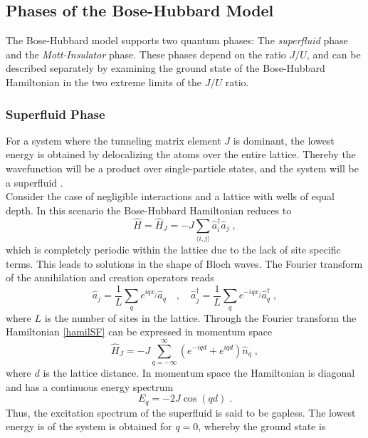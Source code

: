 \subsection{Phases of the Bose-Hubbard Model}

The Bose-Hubbard model supports two quantum phases: The \textit{superfluid} phase and the \textit{Mott-Insulator} phase. These phases depend on the ratio $J/U$, and can be described separately by examining the ground state of the Bose-Hubbard Hamiltonian in the two extreme limits of the $J/U$ ratio.

\subsubsection{Superfluid Phase}
For a system where the tunneling matrix element $J$ is dominant, the lowest energy is obtained by delocalizing the atoms over the entire lattice. Thereby the wavefunction will be a product over single-particle states, and the system will be a superfluid \cite{greiner}.\\
Consider the case of negligible interactions and a lattice with wells of equal depth. In this scenario the Bose-Hubbard Hamiltonian reduces to
\begin{equation}
	\hat{H} = \hat{H}_J = - J \sum_{\langle i,j \rangle} \hat{a}_{i}^{\dag} \hat{a}_{j} \; , 
	\label{hamilSF}
\end{equation}
which is completely periodic within the lattice due to the lack of site specific terms. This leads to solutions in the shape of Bloch waves. The Fourier transform of the annihilation and creation operators reads
\begin{equation}
	\hat{a}_j = \frac{1}{L} \sum_{q}  e^{i q x_j} \hat{a}_q \quad , \quad
	\hat{a}_{j}^{\dag} = \frac{1}{L} \sum_{q}  e^{-i q x_j} \hat{a}_{q}^{\dag} \; ,
\end{equation}
where $L$ is the number of sites in the lattice. Through the Fourier transform the Hamiltonian \eqref{hamilSF} can be expressed in momentum space
\begin{equation}
	\hat{H}_J = - J \sum_{q = - \infty}^{\infty} \left( e^{- i q d } + e^{i q d} \right) \hat{n}_q \; ,
\end{equation}
where $d$ is the lattice distance. In momentum space the Hamiltonian is diagonal and has a continuous energy spectrum
\begin{equation}
	E_q = -2 J \cos(q d) \; .
	\label{SFenergy}
\end{equation}
Thus, the excitation spectrum of the superfluid is said to be gapless. The lowest energy is of the system is obtained for $q = 0$, whereby the ground state is
